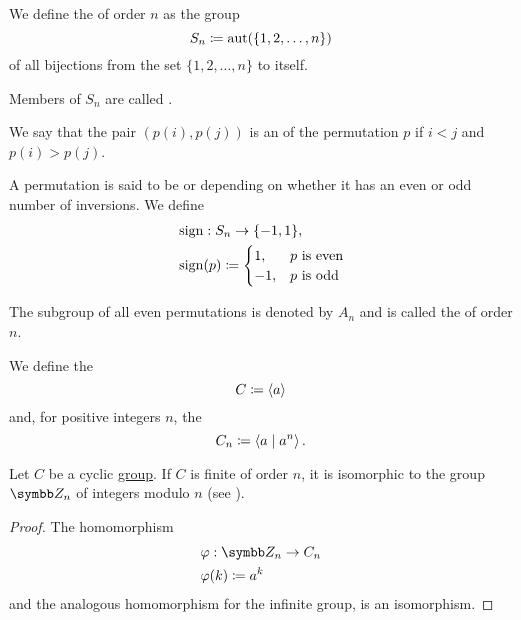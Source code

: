\begin{definition}\label{def:symmetric_group}
  We define the  of order \( n \) as the group
  \begin{equation*}
    S_n \coloneqq \operatorname{aut}(\{ 1, 2, \ldots, n \})
  \end{equation*}
  of all bijections from the set \( \{ 1, 2, \ldots, n \} \) to itself.

  Members of \( S_n \) are called .

  We say that the pair \( (p(i), p(j)) \) is an  of the permutation \( p \) if \( i < j \) and \( p(i) > p(j) \).

  A permutation is said to be  or  depending on whether it has an even or odd number of inversions. We define
  \begin{align*}
    &\operatorname{sign}: S_n \to \{ -1, 1 \}, \\
    &\operatorname{sign}(p) \coloneqq \begin{cases}
      1, &p \text{ is even} \\
      -1, &p \text{ is odd}
    \end{cases}
  \end{align*}

  The subgroup of all even permutations is denoted by \( A_n \) and is called the  of order \( n \).
\end{definition}

\begin{definition}\label{def:cyclic_group}
  We define the 
  \begin{equation*}
    C \coloneqq \left\langle a \right\rangle
  \end{equation*}
  and, for positive integers \( n \), the 
  \begin{equation*}
    C_n \coloneqq \left\langle a \mid a^n \right\rangle.
  \end{equation*}
\end{definition}

\begin{proposition}\label{thm:cyclic_group_isomorphic_to_integers_modulo_n}
  Let \( C \) be a cyclic \hyperref[def:cyclic_group]{group}. If \( C \) is finite of order \( n \), it is isomorphic to the group \( \BZ_n \) of integers modulo \( n \) (see ).
\end{proposition}
\begin{proof}
  The homomorphism
  \begin{align*}
    &\varphi: \BZ_n \to C_n \\
    &\varphi(k) \coloneqq a^k
  \end{align*}
  and the analogous homomorphism for the infinite group, is an isomorphism.
\end{proof}

